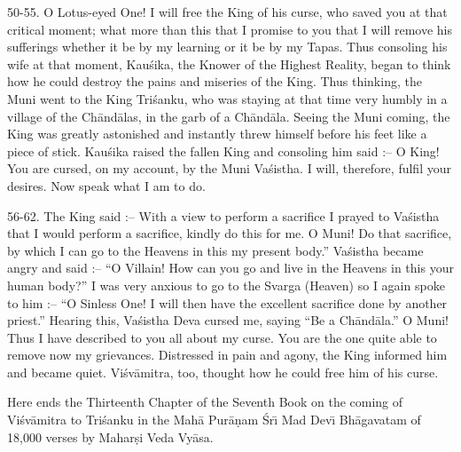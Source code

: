 50-55. O Lotus-eyed One! I will free the King of his curse, who saved you at that critical moment; what more than this that I promise to you that I will remove his sufferings whether it be by my learning or it be by my Tapas. Thus consoling his wife at that moment, Kau\'sika, the Knower of the Highest Reality, began to think how he could destroy the pains and miseries of the King. Thus thinking, the Muni went to the King Tri\'sanku, who was staying at that time very humbly in a village of the Ch\=and\=alas, in the garb of a Ch\=and\=ala. Seeing the Muni coming, the King was greatly astonished and instantly threw himself before his feet like a piece of stick. Kau\'sika raised the fallen King and consoling him said :-- O King! You are cursed, on my account, by the Muni Va\'sistha. I will, therefore, fulfil your desires. Now speak what I am to do.

56-62. The King said :-- With a view to perform a sacrifice I prayed to Va\'sistha that I would perform a sacrifice, kindly do this for me. O Muni! Do that sacrifice, by which I can go to the Heavens in this my present body.'' Va\'sistha became angry and said :-- ``O Villain! How can you go and live in the Heavens in this your human body?'' I was very anxious to go to the Svarga (Heaven)
so I again spoke to him :-- ``O Sinless One! I will then have the excellent sacrifice done by another priest.'' Hearing this, Va\'sistha Deva cursed me, saying ``Be a Ch\=and\=ala.'' O Muni! Thus I have described to you all about my curse. You are the one quite able to remove now my grievances. Distressed in pain and agony, the King informed him and became quiet. Vi\'sv\=amitra, too, thought how he could free him of his curse.

Here ends the Thirteenth Chapter of the Seventh Book on the coming of Vi\'sv\=amitra to Tri\'sanku in the Mah\=a Pur\=a\d{n}am \'Sr\={\i} Mad Dev\={\i} Bh\=agavatam of 18,000 verses by Mahar\d{s}i Veda Vy\=asa.



